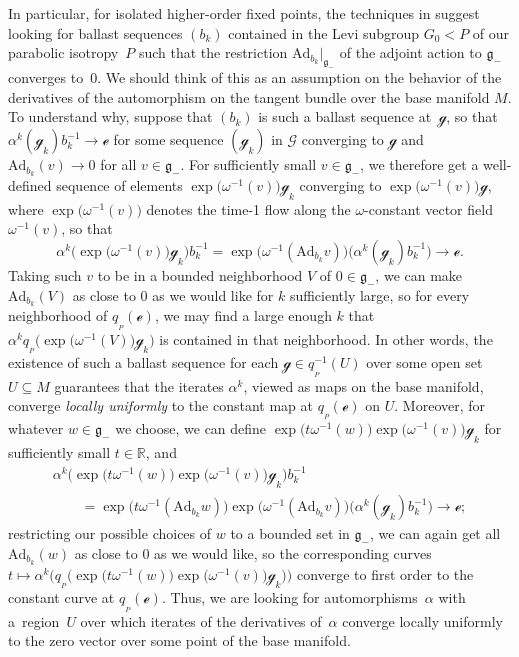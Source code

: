 \documentclass[10pt,a4paper]{amsart}
\numberwithin{equation}{section}
\theoremstyle{definition}
\newcommand{\Ad}{\mathrm{Ad}}
\begin{document}
In particular, for isolated higher-order fixed points, the techniques in \cite{CapMelnick2013,MelnickNeusser2016} suggest looking for ballast sequences $(b_k)$ contained in the Levi subgroup $G_0<P$ of our parabolic isotropy~$P$ such that the restriction $\Ad_{b_k}|_{\mathfrak{g}_-}$ of the adjoint action to $\mathfrak{g}_-$ converges to~$0$. We should think of this as an assumption on the behavior of the derivatives of the automorphism on the tangent bundle over the base manifold $M$. To understand why, suppose that $(b_k)$ is such a ballast sequence at~$\mathscr{g}$, so that $\alpha^k(\mathscr{g}_k)b_k^{-1}\rightarrow\mathscr{e}$ for some sequence $(\mathscr{g}_k)$ in $\mathscr{G}$ converging to $\mathscr{g}$ and $\Ad_{b_k}(v)\rightarrow 0$ for all $v\in\mathfrak{g}_-$. For sufficiently small $v\in\mathfrak{g}_-$, we therefore get a well-defined sequence of elements $\exp\bigl(\omega^{-1}(v)\bigr)\mathscr{g}_k$ converging to $\exp\bigl(\omega^{-1}(v)\bigr)\mathscr{g}$, where $\exp\bigl(\omega^{-1}(v)\bigr)$ denotes the time-1 flow along the $\omega$-constant vector field $\omega^{-1}(v)$, so that
\[\alpha^k\bigl(\exp\bigl(\omega^{-1}(v)\bigr)\mathscr{g}_k\bigr)b_k^{-1} =\exp\bigl(\omega^{-1}(\Ad_{b_k}v)\bigr)\bigl(\alpha^k(\mathscr{g}_k)b_k^{-1}\bigr)\rightarrow\mathscr{e}.\]
Taking such $v$ to be in a bounded neighborhood $V$ of $0\in\mathfrak{g}_-$, we can make $\Ad_{b_k}(V)$ as close to $0$ as we would like for $k$ sufficiently large, so for every neighborhood of $q_{{}_P}(\mathscr{e})$, we may find a large enough $k$ that $\alpha^k q_{{}_P}\bigl(\exp\bigl(\omega^{-1}(V)\bigr)\mathscr{g}_k\bigr)$ is contained in that neighborhood. In other words, the existence of such a ballast sequence for each $\mathscr{g}\in q_{{}_P}^{-1}(U)$ over some open set $U\subseteq M$ guarantees that the iterates $\alpha^k$, viewed as maps on the base manifold, converge \textit{locally uniformly} to the constant map at $q_{{}_P}(\mathscr{e})$ on $U$. Moreover, for whatever $w\in\mathfrak{g}_-$ we choose, we can define $\exp\bigl(t\omega^{-1}(w)\bigr)\exp\bigl(\omega^{-1}(v)\bigr)\mathscr{g}_k$ for sufficiently small $t\in\mathbb{R}$, and
\begin{gather*}
\alpha^k\bigl(\exp\bigl(t\omega^{-1}(w)\bigr)\exp\bigl(\omega^{-1}(v)\bigr)\mathscr{g}_k\bigr)b_k^{-1} \\
\qquad =\exp\bigl(t\omega^{-1}(\Ad_{b_k}w)\bigr)\exp\bigl(\omega^{-1}(\Ad_{b_k}v)\bigr) \bigl(\alpha^k(\mathscr{g}_k)b_k^{-1}\bigr)\rightarrow\mathscr{e};
\end{gather*}
restricting our possible choices of $w$ to a bounded set in $\mathfrak{g}_-$, we can again get all $\Ad_{b_k}(w)$ as close to $0$ as we would like, so the corresponding curves $t\mapsto \alpha^k\bigl(q_{{}_P}\bigl(\exp\bigl(t\omega^{-1}(w)\bigr)\exp\bigl(\omega^{-1}(v)\bigr)\mathscr{g}_k\bigr)\bigr)$ converge to first order to the constant curve at $q_{{}_P}(\mathscr{e})$. Thus, we are looking for automorphisms~$\alpha$ with a~region~$U$ over which iterates of the derivatives of~$\alpha$ converge locally uniformly to the zero vector over some point of the base manifold.
\end{document}
